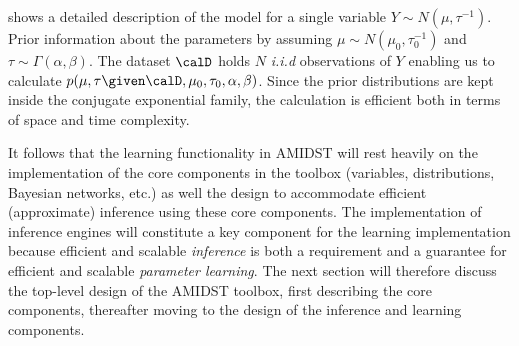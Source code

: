   shows a detailed description of the model for a single variable $Y\sim N\left(\mu,\tau^{-1}\right)$. Prior information about the parameters by assuming $\mu\sim N\left(\mu_0, \tau_0^{-1}\right)$ and $\tau\sim\Gamma(\alpha,\beta)$. The dataset $\calD$ holds  $N$ \textit{i.i.d} observations of $Y$ enabling us to calculate $p(\mu,\tau\given\calD, \mu_0,\tau_0,\alpha,\beta)$. Since the prior distributions are kept inside the conjugate exponential family, the calculation is efficient both in terms of space and time complexity. 

It follows that the learning functionality in AMIDST will rest  heavily on the implementation of the core components in the toolbox (variables, distributions, Bayesian networks, etc.) as well the design to accommodate efficient (approximate) inference using these core components. The implementation of inference engines will constitute a key component for the learning implementation because  efficient and scalable \textit{inference} is both a requirement and a  guarantee for efficient and scalable \textit{parameter learning}. The next section will therefore discuss the top-level design of the AMIDST toolbox, first describing the core components, thereafter moving to the design of the inference and learning components. 






